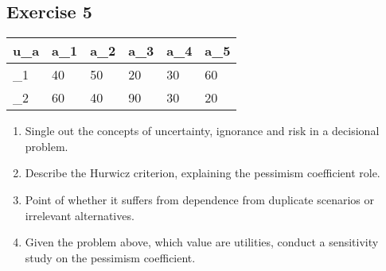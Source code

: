 \documentclass[\main/main.tex]{subfiles}
\begin{document}
\subsection{Exercise 5}

\begin{table}
  \begin{tabular}{L|LLLLL}
    u_{\w a} & a_1 & a_2 & a_3 & a_4 & a_5 \\
    \hline
    \w_1     & 40  & 50  & 20  & 30  & 60  \\
    \w_2     & 60  & 40  & 90  & 30  & 20
  \end{tabular}
\end{table}

\begin{enumerate}
  \item Single out the concepts of uncertainty, ignorance and risk in a decisional problem.
  \item Describe the Hurwicz criterion, explaining the pessimism coefficient role.
  \item Point of whether it suffers from dependence from duplicate scenarios or irrelevant alternatives.
  \item Given the problem above, which value are utilities,  conduct a sensitivity study on the pessimism coefficient.
\end{enumerate}
\end{document}
